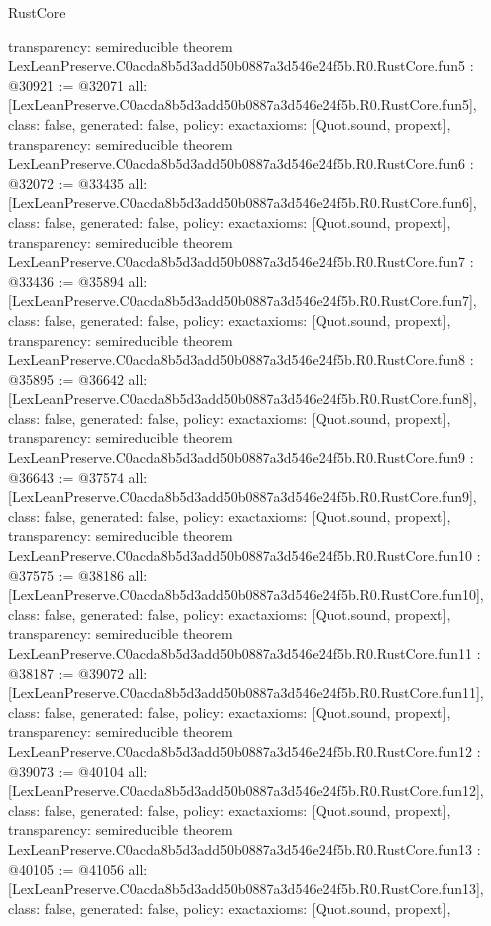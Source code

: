 \begin{lexlean}{RustCore}
\begin{coremodule}
{  transparency: semireducible
}
theorem LexLeanPreserve.C0acda8b5d3add50b0887a3d546e24f5b.R0.RustCore.fun5 : @30921 := @32071 {
  all: [LexLeanPreserve.C0acda8b5d3add50b0887a3d546e24f5b.R0.RustCore.fun5],
  class: false,
  generated: false,
  policy: exact{axioms: [Quot.sound, propext]},
  transparency: semireducible
}
theorem LexLeanPreserve.C0acda8b5d3add50b0887a3d546e24f5b.R0.RustCore.fun6 : @32072 := @33435 {
  all: [LexLeanPreserve.C0acda8b5d3add50b0887a3d546e24f5b.R0.RustCore.fun6],
  class: false,
  generated: false,
  policy: exact{axioms: [Quot.sound, propext]},
  transparency: semireducible
}
theorem LexLeanPreserve.C0acda8b5d3add50b0887a3d546e24f5b.R0.RustCore.fun7 : @33436 := @35894 {
  all: [LexLeanPreserve.C0acda8b5d3add50b0887a3d546e24f5b.R0.RustCore.fun7],
  class: false,
  generated: false,
  policy: exact{axioms: [Quot.sound, propext]},
  transparency: semireducible
}
theorem LexLeanPreserve.C0acda8b5d3add50b0887a3d546e24f5b.R0.RustCore.fun8 : @35895 := @36642 {
  all: [LexLeanPreserve.C0acda8b5d3add50b0887a3d546e24f5b.R0.RustCore.fun8],
  class: false,
  generated: false,
  policy: exact{axioms: [Quot.sound, propext]},
  transparency: semireducible
}
theorem LexLeanPreserve.C0acda8b5d3add50b0887a3d546e24f5b.R0.RustCore.fun9 : @36643 := @37574 {
  all: [LexLeanPreserve.C0acda8b5d3add50b0887a3d546e24f5b.R0.RustCore.fun9],
  class: false,
  generated: false,
  policy: exact{axioms: [Quot.sound, propext]},
  transparency: semireducible
}
theorem LexLeanPreserve.C0acda8b5d3add50b0887a3d546e24f5b.R0.RustCore.fun10 : @37575 := @38186 {
  all: [LexLeanPreserve.C0acda8b5d3add50b0887a3d546e24f5b.R0.RustCore.fun10],
  class: false,
  generated: false,
  policy: exact{axioms: [Quot.sound, propext]},
  transparency: semireducible
}
theorem LexLeanPreserve.C0acda8b5d3add50b0887a3d546e24f5b.R0.RustCore.fun11 : @38187 := @39072 {
  all: [LexLeanPreserve.C0acda8b5d3add50b0887a3d546e24f5b.R0.RustCore.fun11],
  class: false,
  generated: false,
  policy: exact{axioms: [Quot.sound, propext]},
  transparency: semireducible
}
theorem LexLeanPreserve.C0acda8b5d3add50b0887a3d546e24f5b.R0.RustCore.fun12 : @39073 := @40104 {
  all: [LexLeanPreserve.C0acda8b5d3add50b0887a3d546e24f5b.R0.RustCore.fun12],
  class: false,
  generated: false,
  policy: exact{axioms: [Quot.sound, propext]},
  transparency: semireducible
}
theorem LexLeanPreserve.C0acda8b5d3add50b0887a3d546e24f5b.R0.RustCore.fun13 : @40105 := @41056 {
  all: [LexLeanPreserve.C0acda8b5d3add50b0887a3d546e24f5b.R0.RustCore.fun13],
  class: false,
  generated: false,
  policy: exact{axioms: [Quot.sound, propext]},
}
\end{coremodule}
\end{lexlean}
